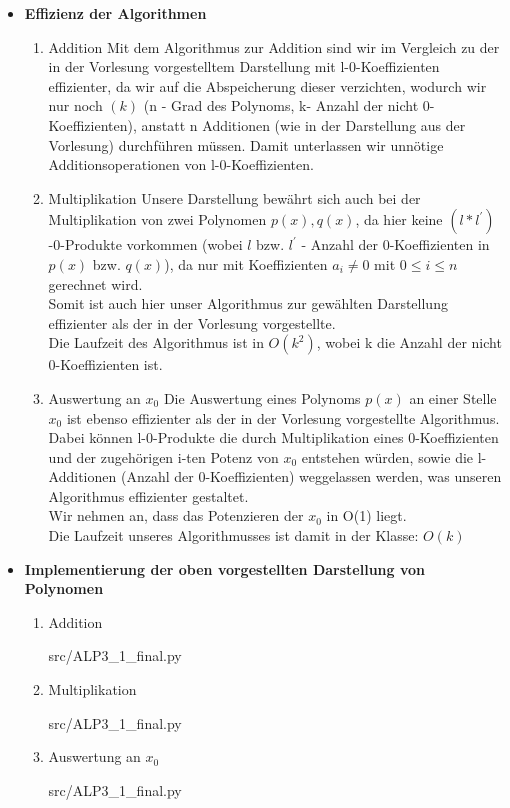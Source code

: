 \newpage
 
\begin{itemize}
	\item \textbf{Effizienz der Algorithmen} 
		\begin{enumerate}
			\item Addition
				Mit dem Algorithmus zur Addition sind wir im Vergleich zu der in der Vorlesung vorgestelltem Darstellung mit l-0-Koeffizienten effizienter, da wir auf die Abspeicherung dieser verzichten, wodurch wir nur noch $(k)$ (n - Grad des Polynoms, k- Anzahl der nicht 0- Koeffizienten), anstatt n Additionen (wie in der Darstellung aus der Vorlesung) durchführen müssen. Damit unterlassen wir unnötige Additionsoperationen von l-0-Koeffizienten. 
			\item Multiplikation
 				Unsere Darstellung bewährt sich auch bei der Multiplikation von zwei Polynomen $p(x),q(x)$, da hier keine $(l*l^')$-0-Produkte vorkommen (wobei $l$ bzw. $l^'$ - Anzahl der 0-Koeffizienten in $p(x)$ bzw. $q(x)$), da nur mit Koeffizienten $a_i \neq 0$ mit $0 \leq i \leq n$ gerechnet wird.\\
				Somit ist auch hier unser Algorithmus zur gewählten Darstellung effizienter als der in der Vorlesung vorgestellte. \\ 
				Die Laufzeit des Algorithmus ist in $O(k^2)$, wobei k die Anzahl der nicht 0-Koeffizienten ist. 
			\item Auswertung an $x_0$
				Die Auswertung eines Polynoms $p(x)$ an einer Stelle $x_0$ ist ebenso effizienter als der in der Vorlesung vorgestellte Algorithmus. Dabei können l-0-Produkte die durch Multiplikation eines 0-Koeffizienten und der zugehörigen i-ten Potenz von $x_0$ entstehen würden, sowie die l-Additionen (Anzahl der 0-Koeffizienten) weggelassen werden, was unseren Algorithmus effizienter gestaltet. \\
				Wir nehmen an, dass das Potenzieren der $x_0$ in O(1) liegt. \\
				Die Laufzeit unseres Algorithmusses ist damit in der Klasse: $O(k)$\\
		\end{enumerate}
		
		\item \textbf{Implementierung der oben vorgestellten Darstellung von Polynomen}
		\begin{enumerate}
		  \item Addition		
														
			{src/ALP3_1_final.py}
		  \newpage	
		  \item Multiplikation
														
			{src/ALP3_1_final.py}
		  \item Auswertung an $x_0$
		  												
			{src/ALP3_1_final.py}
		\end{enumerate}
\end{itemize}
\newpage
